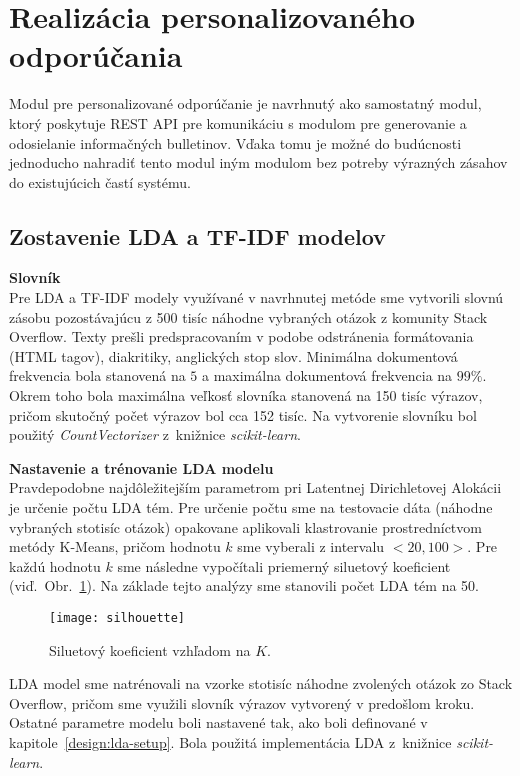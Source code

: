 \section{Realizácia personalizovaného odporúčania}
\label{impl:rec}

Modul pre personalizované odporúčanie je navrhnutý ako samostatný modul, ktorý poskytuje REST API pre komunikáciu
s modulom pre generovanie a odosielanie informačných bulletinov. Vďaka tomu je možné do budúcnosti jednoducho nahradiť
tento modul iným modulom bez potreby výrazných zásahov do existujúcich častí systému.

\subsection{Zostavenie LDA a TF-IDF modelov}

\textbf{Slovník}\\
Pre LDA a TF-IDF modely využívané v navrhnutej metóde sme vytvorili slovnú zásobu pozostávajúcu z 500 tisíc náhodne vybraných
otázok z komunity Stack Overflow. Texty prešli predspracovaním v podobe odstránenia formátovania (HTML tagov), diakritiky,
anglických stop slov. Minimálna dokumentová frekvencia bola stanovená na $5$ a maximálna dokumentová frekvencia na $99\%$.
Okrem toho bola maximálna veľkosť slovníka stanovená na 150 tisíc výrazov, pričom skutočný počet výrazov bol cca 152 tisíc.
Na vytvorenie slovníku bol použitý \textit{CountVectorizer} z~knižnice \textit{scikit-learn}.

\textbf{Nastavenie a trénovanie LDA modelu}\\
Pravdepodobne najdôležitejším parametrom pri Latentnej Dirichletovej Alokácii je určenie počtu LDA tém. Pre určenie počtu sme
na testovacie dáta (náhodne vybraných stotisíc otázok) opakovane aplikovali klastrovanie prostredníctvom metódy K-Means, pričom
hodnotu $k$ sme vyberali z intervalu $<20,100>$. Pre každú hodnotu $k$ sme následne vypočítali priemerný siluetový koeficient
(viď.~Obr.~\ref{fig:silhouette}). Na základe tejto analýzy sme stanovili počet LDA tém na 50.

\begin{figure}[H]\begin{center}
\texttt{[image: silhouette]}
\caption{Siluetový koeficient vzhľadom na $K$. \label{fig:silhouette}}\end{center}
\end{figure}

LDA model sme natrénovali na vzorke stotisíc náhodne zvolených otázok zo Stack Overflow, pričom sme využili slovník výrazov
vytvorený v predošlom kroku. Ostatné parametre modelu boli nastavené tak, ako boli definované v kapitole~\ref{design:lda-setup}.
Bola použitá implementácia LDA z~knižnice \textit{scikit-learn}.

